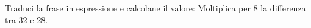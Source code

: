 \item Traduci la frase in espressione e calcolane il valore: Moltiplica per 8 la differenza tra 32 e 28.